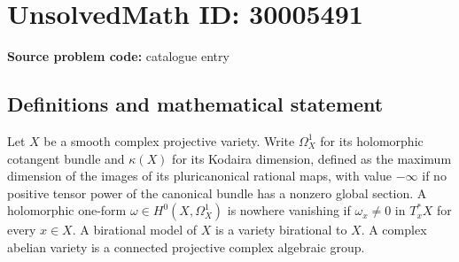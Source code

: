 \documentclass[11pt]{article}
\begin{document}
\section*{UnsolvedMath ID: 30005491}
\textbf{Source problem code:} catalogue entry
\subsection{Definitions and mathematical statement}
Let \(X\) be a smooth complex projective variety. Write \(\Omega_X^1\) for its holomorphic cotangent bundle and \(\kappa(X)\) for its Kodaira dimension, defined as the maximum dimension of the images of its pluricanonical rational maps, with value \(-\infty\) if no positive tensor power of the canonical bundle has a nonzero global section. A holomorphic one-form \(\omega\in H^0(X,\Omega_X^1)\) is nowhere vanishing if \(\omega_x\ne 0\) in \(T_x^*X\) for every \(x\in X\). A birational model of \(X\) is a variety birational to \(X\). A complex abelian variety is a connected projective complex algebraic group.
\end{document}
